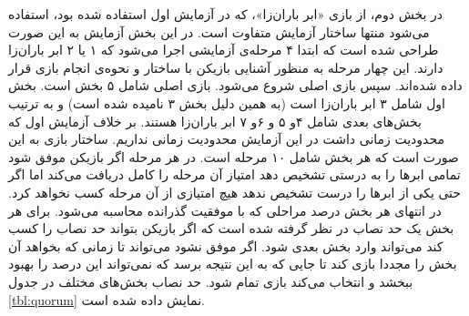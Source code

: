 \documentclass[twoside, a4paper,11pt]{book}
\numberwithin{equation}{chapter}
\numberwithin{table}{chapter}
\numberwithin{figure}{chapter}
\numberwithin{equation}{chapter}
\begin{document}
در بخش دوم، از بازی «ابر باران‌زا»، که در آزمایش اول استفاده شده بود، استفاده می‌شود منتها ساختار آزمایش متفاوت است. در این بخش آزمایش به این صورت طراحی شده است که ابتدا ۴ مرحله‌ی آزمایشی اجرا می‌شود که ۱ یا ۲ ابر باران‌زا دارند. این چهار مرحله به منظور آشنایی بازیکن با ساختار و نحوه‌ی انجام بازی قرار داده شده‌اند. سپس بازی اصلی شروع می‌شود. بازی اصلی شامل ۵ بخش است. بخش اول شامل ۳ ابر باران‌زا است (به همین دلیل بخش ۳ نامیده شده است) و به ترتیب بخش‌های بعدی شامل ۴و ۵ و ۶و ۷ ابر باران‌زا هستند. بر خلاف آزمایش اول که محدودیت زمانی داشت در این آزمایش محدودیت زمانی نداریم. ساختار بازی به این صورت است که هر بخش شامل ۱۰ مرحله است. در هر مرحله اگر بازیکن موفق شود تمامی ابرها را به درستی تشخیص دهد امتیاز آن مرحله را کامل دریافت می‌کند اما اگر حتی یکی از ابرها را درست تشخیص ندهد هیچ امتیازی از آن مرحله کسب نخواهد کرد. در انتهای هر بخش درصد مراحلی که با موفقیت گذرانده محاسبه می‌شود. برای هر بخش یک حد نصاب در نظر گرفته شده است که اگر بازیکن بتواند حد نصاب را کسب کند می‌تواند وارد بخش بعدی شود. اگر موفق نشود می‌تواند تا زمانی که بخواهد آن بخش را مجددا بازی کند تا جایی که به این نتیجه برسد که نمی‌تواند این درصد را بهبود ببخشد و انتخاب می‌کند بازی تمام شود. حد نصاب بخش‌های مختلف در جدول \ref{tbl:quorum} نمایش داده شده است. 

\begin{table}[]
\end{table}
\end{document}
